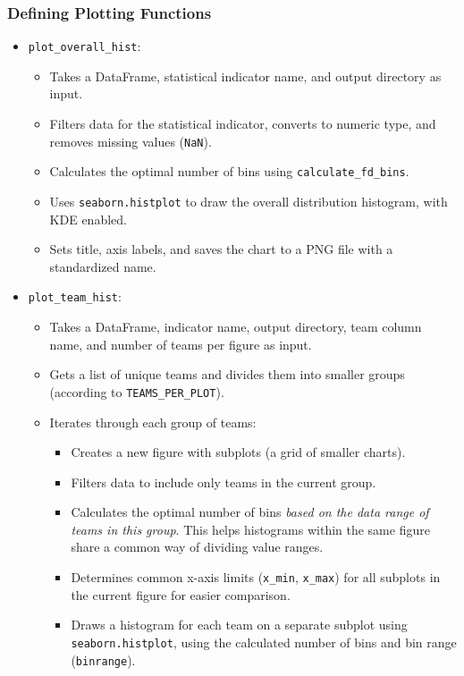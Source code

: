 \documentclass[12pt, a4paper]{report}
\begin{document}
\subsubsection*{Defining Plotting Functions}
\begin{itemize}
    \item \texttt{plot\_overall\_hist}:
    \begin{itemize}
        \item Takes a DataFrame, statistical indicator name, and output directory as input.
        \item Filters data for the statistical indicator, converts to numeric type, and removes missing values (\texttt{NaN}).
        \item Calculates the optimal number of bins using \texttt{calculate\_fd\_bins}.
        \item Uses \texttt{seaborn.histplot} to draw the overall distribution histogram, with KDE enabled.
        \item Sets title, axis labels, and saves the chart to a PNG file with a standardized name.
    \end{itemize}
    \item \texttt{plot\_team\_hist}:
    \begin{itemize}
        \item Takes a DataFrame, indicator name, output directory, team column name, and number of teams per figure as input.
        \item Gets a list of unique teams and divides them into smaller groups \sloppypar
 (according to \texttt{TEAMS\_PER\_PLOT}).
        \item Iterates through each group of teams:
        \begin{itemize}
            \item Creates a new figure with subplots (a grid of smaller charts).
            \item Filters data to include only teams in the current group.
            \item Calculates the optimal number of bins \textit{based on the data range of teams in this group}. This helps histograms within the same figure share a common way of dividing value ranges.
            \item Determines common x-axis limits (\texttt{x\_min}, \texttt{x\_max}) for all subplots in the current figure for easier comparison.
            \item Draws a histogram for each team on a separate subplot using \texttt{seaborn.histplot}, using the calculated number of bins and bin range (\texttt{binrange}).

\end{itemize}
\end{itemize}
\end{itemize}
\end{document}
